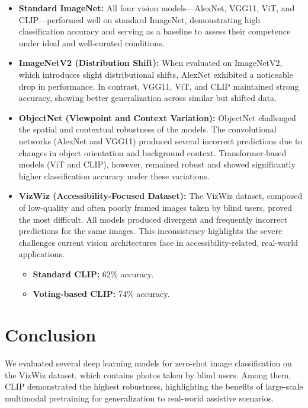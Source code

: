 \documentclass[9pt,a4paper,twocolumn,twoside]{tau-class/tau}
\begin{document}
\begin{itemize}[leftmargin=1.5em]
    \item \textbf{Standard ImageNet:}  
    All four vision models—AlexNet, VGG11, ViT, and CLIP—performed well on standard ImageNet, demonstrating high classification accuracy and serving as a baseline to assess their competence under ideal and well-curated conditions.

    \item \textbf{ImageNetV2 (Distribution Shift):}  
    When evaluated on ImageNetV2, which introduces slight distributional shifts, AlexNet exhibited a noticeable drop in performance. In contrast, VGG11, ViT, and CLIP maintained strong accuracy, showing better generalization across similar but shifted data.

    \item \textbf{ObjectNet (Viewpoint and Context Variation):}  
    ObjectNet challenged the spatial and contextual robustness of the models. The convolutional networks (AlexNet and VGG11) produced several incorrect predictions due to changes in object orientation and background context. Transformer-based models (ViT and CLIP), however, remained robust and showed significantly higher classification accuracy under these variations.

    \item \textbf{VizWiz (Accessibility-Focused Dataset):}  
    The VizWiz dataset, composed of low-quality and often poorly framed images taken by blind users, proved the most difficult. All models produced divergent and frequently incorrect predictions for the same images. This inconsistency highlights the severe challenges current vision architectures face in accessibility-related, real-world applications.

    \begin{itemize}
    \item \textbf{Standard CLIP:} 62\% accuracy.
    \item \textbf{Voting-based CLIP:} 74\% accuracy.
    \end{itemize}
    
\end{itemize}

\section{Conclusion}

We evaluated several deep learning models for zero-shot image classification on the VizWiz dataset, which contains photos taken by blind users. Among them, CLIP demonstrated the highest robustness, highlighting the benefits of large-scale multimodal pretraining for generalization to real-world assistive scenarios.
\end{document}
